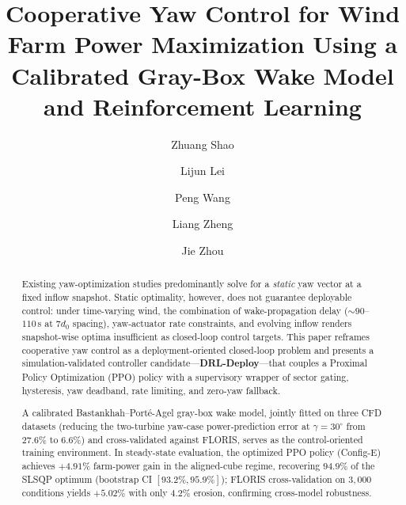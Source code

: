 \documentclass[final,5p,times]{elsarticle}
\begin{document}
\begin{frontmatter}

\title{Cooperative Yaw Control for Wind Farm Power Maximization Using a Calibrated Gray-Box Wake Model and Reinforcement Learning}

\author[a]{Zhuang Shao}
\author[b]{Lijun Lei}
\author[c]{Peng Wang}
\author[b]{Liang Zheng}
\author[b]{Jie Zhou}


\address[a]{China Resources Power Technology Research Institute Co., Ltd., Shenzhen 518000, Guangdong Province, China}
\address[b]{Rundian Energy Science and Technology Co., Ltd., Zhengzhou 450052, Henan Province, China}
\address[c]{North China University of Water Resources and Electric Power, Zhengzhou 450046, Henan Province, China}

\begin{abstract}
Existing yaw-optimization studies predominantly solve for a \emph{static} yaw vector at a fixed inflow snapshot. Static optimality, however, does not guarantee deployable control: under time-varying wind, the combination of wake-propagation delay (${\sim}90$--$110$\,s at $7d_0$ spacing), yaw-actuator rate constraints, and evolving inflow renders snapshot-wise optima insufficient as closed-loop control targets. This paper reframes cooperative yaw control as a deployment-oriented closed-loop problem and presents a simulation-validated controller candidate---\textbf{DRL-Deploy}---that couples a Proximal Policy Optimization (PPO) policy with a supervisory wrapper of sector gating, hysteresis, yaw deadband, rate limiting, and zero-yaw fallback.

A calibrated Bastankhah--Port\'e-Agel gray-box wake model, jointly fitted on three CFD datasets (reducing the two-turbine yaw-case power-prediction error at $\gamma\!=\!30^\circ$ from $27.6\%$ to $6.6\%$) and cross-validated against FLORIS, serves as the control-oriented training environment. In steady-state evaluation, the optimized PPO policy (Config-E) achieves $+4.91\%$ farm-power gain in the aligned-cube regime, recovering $94.9\%$ of the SLSQP optimum (bootstrap CI $[93.2\%, 95.9\%]$); FLORIS cross-validation on $3{,}000$ conditions yields $+5.02\%$ with only $4.2\%$ erosion, confirming cross-model robustness.


\end{abstract}
\end{frontmatter}
\end{document}
